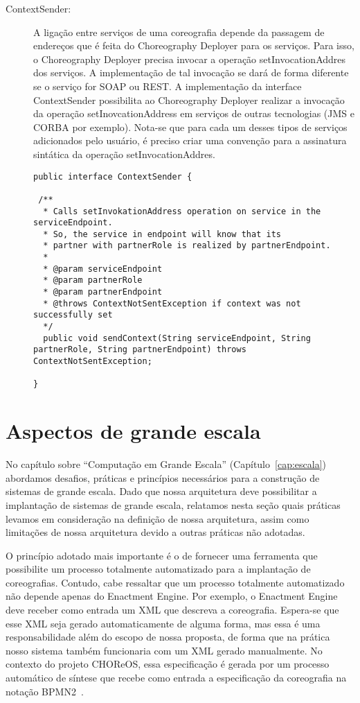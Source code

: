 \begin{description}
\item [ContextSender:]

A ligação entre serviços de uma coreografia depende da passagem de endereços que é feita do Choreography Deployer para os serviços. Para isso, o Choreography Deployer precisa invocar a operação setInvocationAddres dos serviços. A implementação de tal invocação se dará de forma diferente se o serviço for SOAP ou REST. A implementação da interface ContextSender possibilita ao Choreography Deployer realizar a invocação da operação setInovcationAddress em serviços de outras tecnologias (JMS e CORBA por exemplo). Nota-se que para cada um desses tipos de serviços adicionados pelo usuário, é preciso criar uma convenção para a assinatura sintática da operação setInvocationAddres.

\begin{lstlisting}[frame=trbl, label=lst:context_sender, caption=Interface ContextSender]
public interface ContextSender {
	
 /**
  * Calls setInvokationAddress operation on service in the serviceEndpoint.
  * So, the service in endpoint will know that its
  * partner with partnerRole is realized by partnerEndpoint.
  * 
  * @param serviceEndpoint
  * @param partnerRole
  * @param partnerEndpoint
  * @throws ContextNotSentException if context was not successfully set
  */
  public void sendContext(String serviceEndpoint, String partnerRole, String partnerEndpoint) throws ContextNotSentException;

}
\end{lstlisting}

\end{description}

\section{Aspectos de grande escala}
\label{sec:solucao_grande_escala}

No capítulo sobre ``Computação em Grande Escala'' (Capítulo~\ref{cap:escala}) abordamos desafios, práticas e princípios necessários para a construção de sistemas de grande escala. Dado que nossa arquitetura deve possibilitar a implantação de sistemas de grande escala, relatamos nesta seção quais práticas levamos em consideração na definição de nossa arquitetura, assim como limitações de nossa arquitetura devido a outras práticas não adotadas.

O princípio adotado mais importante é o de fornecer uma ferramenta que possibilite um processo totalmente automatizado para a implantação de coreografias. Contudo, cabe ressaltar que um processo totalmente automatizado não depende apenas do Enactment Engine. Por exemplo, o Enactment Engine deve receber como entrada um XML que descreva a coreografia. Espera-se que esse XML seja gerado automaticamente de alguma forma, mas essa é uma responsabilidade além do escopo de nossa proposta, de forma que na prática nosso sistema também funcionaria com um XML gerado manualmente. No contexto do projeto CHOReOS, essa especificação é gerada por um processo automático de síntese que recebe como entrada a especificação da coreografia na notação BPMN2~\cite{Autili2013Synthesis}.

